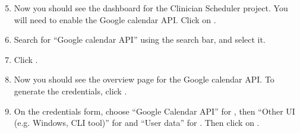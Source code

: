 \documentclass[letterpaper,10pt,english]{sphinxmanual}
\begin{document}
\begin{figure}[H]
\centering
{}\end{figure}
\begin{enumerate}
\setcounter{enumi}{4}
\item {} 
Now you should see the dashboard for the Clinician Scheduler project.
You will need to enable the Google calendar API. Click on .

\end{enumerate}

\begin{figure}[H]
\centering
{}\end{figure}
\begin{enumerate}
\setcounter{enumi}{5}
\item {} 
Search for “Google calendar API” using the search bar, and select it.

\end{enumerate}

\begin{figure}[H]
\centering
{}\end{figure}
\begin{enumerate}
\setcounter{enumi}{6}
\item {} 
Click .

\end{enumerate}

\begin{figure}[H]
\centering
{}\end{figure}
\begin{enumerate}
\setcounter{enumi}{7}
\item {} 
Now you should see the overview page for the Google calendar API.
To generate the credentials, click .

\end{enumerate}

\begin{figure}[H]
\centering
{}\end{figure}
\begin{enumerate}
\setcounter{enumi}{8}
\item {} 
On the credentials form, choose “Google Calendar API” for ,
then “Other UI (e.g. Windows, CLI tool)” for 
and “User data” for . Then click on .

\end{enumerate}
\end{document}
